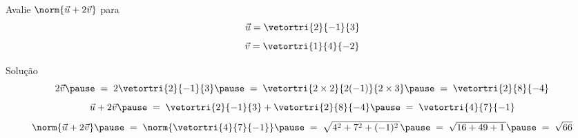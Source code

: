 \begin{question}
  Avalie
  \(
    \norm{\vec{u} + 2 \vec{v}}
  \)
  para
  \[
    \vec{u} = \vetortri{2}{-1}{3}
  \]
  \[
    \vec{v} = \vetortri{1}{4}{-2}
  \]
\end{question}

\begin{resolution}{Solução}
  \[
    2\vec{v}
    \pause
    \;=\; 2 \vetortri{2}{-1}{3}
    \pause
    \;=\; \vetortri{2\times 2}{2(-1)}{2\times 3}
    \pause
    \;=\; \vetortri{2}{8}{-4}
  \]
  \pause
  \[
    \vec{u} + 2 \vec{v}
    \pause
    \;=\; \vetortri{2}{-1}{3} + \vetortri{2}{8}{-4}
    \pause
    \;=\; \vetortri{4}{7}{-1}
  \]
  \pause
  \[
    \norm{\vec{u} + 2 \vec{v}}
    \pause
    \;=\; \norm{\vetortri{4}{7}{-1}}
    \pause
    \;=\; \sqrt{4^2 + 7^2 + (-1)^2\,}
    \pause
    \;=\; \sqrt{16 + 49 + 1\,}
    \pause
    \;=\; \sqrt{66}
  \]
\end{resolution}

\endinput


